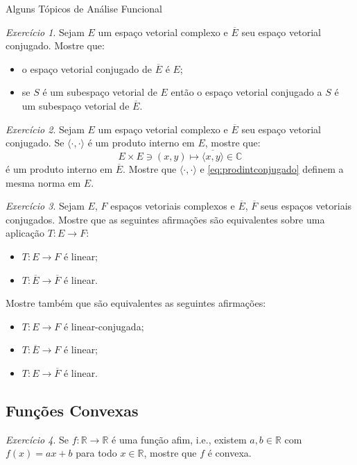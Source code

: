 \documentclass[oneside,final,11pt]{amsbook}
\newcommand{\R}{\mathds R}
\newcommand{\C}{\mathds C}
\theoremstyle{remark}\newtheorem{exercise}{Exercício}[chapter]
\theoremstyle{remark}\newtheorem{*exercise}[exercise]{\hbox to 0pt{\hskip 0pt minus 1fil*}Exercício}
\theoremstyle{definition}\newtheorem{exdefin}{Definição}[chapter]
\theoremstyle{plain}\newtheorem{teo}{Teorema}[section]
\theoremstyle{plain}\newtheorem{lem}[teo]{Lema}
\theoremstyle{plain}\newtheorem{prop}[teo]{Proposição}
\theoremstyle{plain}\newtheorem{cor}[teo]{Corolário}
\theoremstyle{definition}\newtheorem{defin}[teo]{Definição}
\theoremstyle{remark}\newtheorem{rem}[teo]{Observação}
\theoremstyle{definition}\newtheorem{notation}[teo]{Notação}
\theoremstyle{definition}\newtheorem{convention}[teo]{Convenção}
\theoremstyle{definition}\newtheorem{example}[teo]{Exemplo}
\numberwithin{section}{chapter}
\numberwithin{equation}{section}
\begin{document}
\begin{chapter}{Alguns Tópicos de Análise Funcional}
\begin{exercise}\label{exe:espconjugado2}
Sejam $E$ um espaço vetorial complexo e $\overline E$ seu espaço vetorial conjugado. Mostre que:
\begin{itemize}
\item o espaço vetorial conjugado de $\overline E$ é $E$;
\item se $S$ é um subespaço vetorial de $E$ então o espaço vetorial conjugado a $S$
é um subespaço vetorial de $\overline E$.
\end{itemize}
\end{exercise}

\begin{exercise}\label{exe:espconjugado3}
Sejam $E$ um espaço vetorial complexo e $\overline E$ seu espaço vetorial conjugado.
Se $\langle\cdot,\cdot\rangle$ é um produto interno em $E$, mostre que:
\begin{equation}\label{eq:prodintconjugado}
E\times E\ni(x,y)\longmapsto\overline{\langle x,y\rangle}\in\C
\end{equation}
é um produto interno em $\overline E$. Mostre que $\langle\cdot,\cdot\rangle$
e \eqref{eq:prodintconjugado} definem a mesma norma em $E$.
\end{exercise}

\begin{exercise}\label{exe:espconjugado4}
Sejam $E$, $F$ espaços vetoriais complexos e $\overline E$, $\overline F$ seus espaços
vetoriais conjugados. Mostre que as seguintes afirmações são equivalentes sobre
uma aplicação $T:E\to F$:
\begin{itemize}
\item $T:E\to F$ é linear;
\item $T:\overline E\to\overline F$ é linear.
\end{itemize}
Mostre também que são equivalentes as seguintes afirmações:
\begin{itemize}
\item $T:E\to F$ é linear-conjugada;
\item $T:\overline E\to F$ é linear;
\item $T:E\to\overline F$ é linear.
\end{itemize}
\end{exercise}

\subsection*{Funções Convexas}

\begin{exercise}\label{exe:retaconvexa}
Se $f:\R\to\R$ é uma função afim, i.e., existem $a,b\in\R$ com $f(x)=ax+b$ para todo
$x\in\R$, mostre que $f$ é convexa.
\end{exercise}

\end{chapter}
\end{document}
